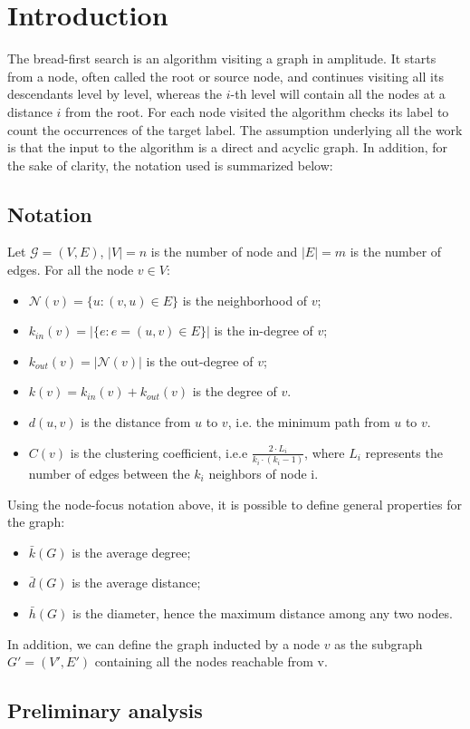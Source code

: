 
\section{Introduction}
The bread-first search is an algorithm visiting a graph in amplitude. It starts from a node, 
often called the root or source node, and continues visiting all its descendants level
by level, whereas the $i$-th level will contain all the nodes at a distance 
$i$ from the root.
For each node visited the algorithm checks its label to count the occurrences of the target label.
The assumption underlying all the work is that the input to the algorithm is a direct and 
acyclic graph. In addition, for the sake of clarity, the notation used is summarized below:
\subsection{Notation}
Let $\mathcal{G} = (V, E)$, $|V| = n$ is the number of node and $|E| = m$ is the number of edges. 
For all the node $v \in V$:
\begin{itemize}
    \item $\mathcal{N}(v) = \{u : (v, u) \in E\}$ is the neighborhood of $v$;
    \item $k_{in}(v) = |\{e: e=(u, v) \in E\}|$ is the in-degree of $v$;
    \item $k_{out}(v) = |\mathcal{N}(v)|$ is the out-degree of $v$;
    \item $k(v) = k_{in}(v) + k_{out}(v)$ is the degree of $v$.
    \item $d(u, v)$ is the distance from $u$ to $v$, i.e. the minimum path from $u$ to $v$.
    \item $C(v)$ is the clustering coefficient, i.e.e $\frac{2 \cdot L_i}{k_i\cdot(k_i - 1)}$, where $L_i$ represents the number of edges between the $k_i$ neighbors of node i.
\end{itemize}
Using the node-focus notation above,
 it is possible to define general properties for the graph:
\begin{itemize}
    \item $\bar{k}(G)$ is the average degree;
    \item $\bar{d}(G)$ is the average distance;
    \item $\bar{h}(G)$ is the diameter, hence the maximum distance among any two nodes.
\end{itemize}
In addition, we can define 
the graph inducted by a node $v$ as the subgraph $G'=(V', E')$ containing all the nodes reachable from v.  
\subsection{Preliminary analysis}
